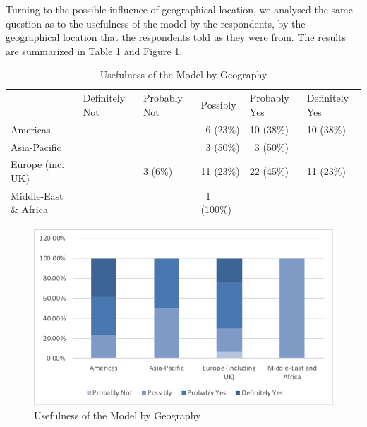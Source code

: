 Turning to the possible influence of geographical location, we analysed the same question as to the usefulness of the model by the respondents, by the geographical location that the respondents told us they were from.  The results are summarized in Table \ref{table:usefulnessbygeo} and Figure \ref{figure:usefulnessbygeo}.

\begin{table}
\caption{Usefulness of the Model by Geography}
\label{table:usefulnessbygeo}
\footnotesize
\begin{tabular}{l p{1.5cm} p{1.5cm} p{1.5cm} p{1.5cm} p{1.5cm}}
 & \centering Definitely Not & 
   \centering Probably Not & 
   \centering Possibly & 
   \centering Probably Yes & 
   \centering Definitely Yes \tabularnewline
Americas              & &         & ~6 (23\%)  & 10 (38\%) & 10 (38\%) \\
Asia-Pacific          & &         & ~3 (50\%)  & ~3 (50\%) & \\
Europe (inc. UK)      & & 3 (6\%) & 11 (23\%)  & 22 (45\%) & 11 (23\%) \\
Middle-East \& Africa & &         & ~1 (100\%) &           & \\
\end{tabular}
\end{table}
 
\begin{figure}
\centering
\includegraphics[width=12cm,trim={2 2 2 2},clip]{Figures/prioritisation-usefulness-by-geo}
\caption{Usefulness of the Model by Geography}
\label{figure:usefulnessbygeo}
\end{figure}

